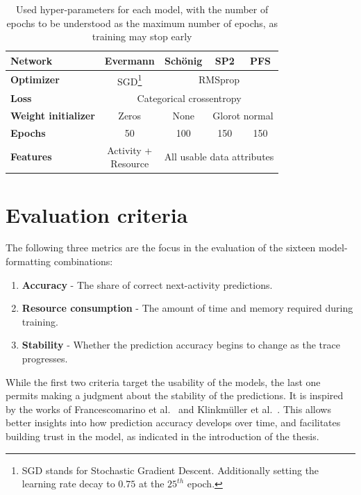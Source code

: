 \begin{table}[ht!]
    \centering
    \begin{tabular}{lcccc}
        \textbf{Network}   & \textbf{Evermann} & \textbf{Schönig} & \textbf{SP2} & \textbf{PFS}\\
        \hline
        \textbf{Optimizer} & SGD\footnote{SGD stands for Stochastic Gradient Descent. Additionally setting the learning rate decay to $0.75$ at the $25^{th}$ epoch.} & \multicolumn{3}{c}{RMSprop} \\
        \textbf{Loss}      &\multicolumn{4}{c}{Categorical crossentropy}\\
        \textbf{Weight initializer} & Zeros & None & \multicolumn{2}{c}{Glorot normal}\\
        \textbf{Epochs}    & 50 & 100 & 150 & 150\\
        \textbf{Features}  & \makecell{Activity +\\Resource} & \multicolumn{3}{c}{All usable data attributes}\\
    \end{tabular}
    \caption{Used hyper-parameters for each model, with the number of epochs to be understood as the maximum number of epochs, as training may stop early}
    \label{tab:training-setup}
\end{table}

\section{Evaluation criteria}
\label{sec:eval:criteria}
The following three metrics are the focus in the evaluation of the sixteen model-formatting combinations:

\begin{enumerate}
    \item\textbf{Accuracy} - The share of correct next-activity predictions.
    \item\textbf{Resource consumption} - The amount of time and memory required during training.
    \item\textbf{Stability} - Whether the prediction accuracy begins to change as the trace progresses.
\end{enumerate}

While the first two criteria target the usability of the models, the last one permits making a judgment about the stability of the predictions. It is inspired by the works of Francescomarino et al.~\cite{francescomarino2015} and Klinkmüller et al.~\cite{klinkmuller2018reliablemonitoring}. This allows better insights into how prediction accuracy develops over time, and facilitates building trust in the model, as indicated in the introduction of the thesis.

